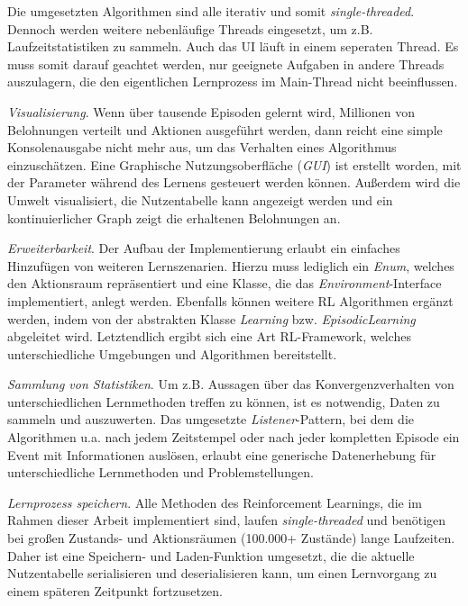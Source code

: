 Die umgesetzten Algorithmen sind alle iterativ und somit \textit{single-threaded}. Dennoch werden weitere nebenläufige Threads eingesetzt, um z.B. Laufzeitstatistiken zu sammeln. Auch das UI läuft in einem seperaten Thread. Es muss somit darauf geachtet werden, nur geeignete Aufgaben in andere Threads auszulagern, die den eigentlichen Lernprozess im Main-Thread nicht beeinflussen.
\par 
\textit{Visualisierung}. Wenn über tausende Episoden gelernt wird, Millionen von Belohnungen verteilt und Aktionen ausgeführt werden, dann reicht eine simple Konsolenausgabe nicht mehr aus, um das Verhalten eines Algorithmus einzuschätzen. Eine Graphische Nutzungsoberfläche (\textit{GUI}) ist erstellt worden, mit der Parameter während des Lernens gesteuert werden können. Außerdem wird die Umwelt visualisiert, die Nutzentabelle kann angezeigt werden und ein kontinuierlicher Graph zeigt die erhaltenen Belohnungen an.

\textit{Erweiterbarkeit}. Der Aufbau der Implementierung erlaubt ein einfaches Hinzufügen von weiteren Lernszenarien. Hierzu muss lediglich ein \textit{Enum}, welches den Aktionsraum repräsentiert und eine Klasse, die das \textit{Environment}-Interface implementiert, anlegt werden. Ebenfalls können weitere RL Algorithmen ergänzt werden, indem von der abstrakten Klasse \textit{Learning} bzw. \textit{EpisodicLearning} abgeleitet wird. Letztendlich ergibt sich eine Art RL-Framework, welches unterschiedliche Umgebungen und Algorithmen bereitstellt.

\textit{Sammlung von Statistiken}. Um z.B. Aussagen über das Konvergenzverhalten von unterschiedlichen Lernmethoden treffen zu können, ist es notwendig, Daten zu sammeln und auszuwerten. Das umgesetzte \textit{Listener}-Pattern, bei dem die Algorithmen u.a. nach jedem Zeitstempel oder nach jeder kompletten Episode ein Event mit Informationen auslösen, erlaubt eine generische Datenerhebung für unterschiedliche Lernmethoden und Problemstellungen.

\textit{Lernprozess speichern}. Alle Methoden des Reinforcement Learnings, die im Rahmen dieser Arbeit implementiert sind, laufen \textit{single-threaded} und benötigen bei großen Zustands- und Aktionsräumen (100.000+ Zustände) lange Laufzeiten. Daher ist eine Speichern- und Laden-Funktion umgesetzt, die die aktuelle Nutzentabelle serialisieren und deserialisieren kann, um einen Lernvorgang zu einem späteren Zeitpunkt fortzusetzen.

